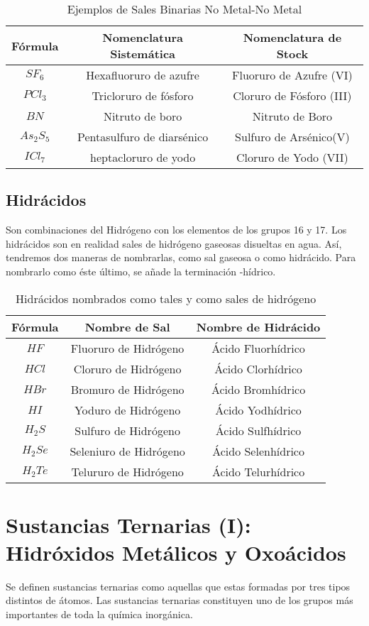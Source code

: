 \begin{table}[h!]
	\centering
	\begin{tabular}{c|cc}
		Fórmula&Nomenclatura Sistemática&Nomenclatura de Stock\\ \hline
		$SF_6$&Hexafluoruro de azufre&Fluoruro de Azufre (VI)\\ 
		$PCl_{3}$&Tricloruro de fósforo&Cloruro de Fósforo (III)\\
		$BN$&Nitruto de boro&Nitruto de Boro\\
		$As_{2}S_{5}$&Pentasulfuro de diarsénico&Sulfuro de Arsénico(V)\\
		$ICl_{7}$&heptacloruro de yodo&Cloruro de Yodo (VII)\\ \hline
	\end{tabular}
	\caption{Ejemplos de Sales Binarias No Metal-No Metal}
\end{table}

\subsection{Hidrácidos}
Son combinaciones del Hidrógeno con los elementos de los grupos 16 y 17. Los hidrácidos son en realidad sales de hidrógeno gaseosas disueltas en agua. Así, tendremos dos maneras de nombrarlas, como sal gaseosa o como hidrácido. Para nombrarlo como éste último, se añade la terminación -hídrico.

\begin{table}[h!]
	\centering
	\begin{tabular}{c|cc}
		Fórmula&Nombre de Sal&Nombre de Hidrácido\\ \hline
		$HF$&Fluoruro de Hidrógeno&Ácido Fluorhídrico\\ 
		$HCl$&Cloruro de Hidrógeno&Ácido Clorhídrico\\ 
		$HBr$&Bromuro de Hidrógeno&Ácido Bromhídrico\\ 
		$HI$&Yoduro de Hidrógeno&Ácido Yodhídrico\\ 
		$H_{2}S$&Sulfuro de Hidrógeno&Ácido Sulfhídrico\\
		$H_{2}Se$&Seleniuro de Hidrógeno&Ácido Selenhídrico\\
		$H_{2}Te$&Telururo de Hidrógeno&Ácido Telurhídrico\\ \hline
	\end{tabular}
	\caption{Hidrácidos nombrados como tales y como sales de hidrógeno}
\end{table}

\section{Sustancias Ternarias (I): Hidróxidos Metálicos y Oxoácidos}
Se definen sustancias ternarias como aquellas que estas formadas por tres tipos distintos de átomos. Las sustancias ternarias constituyen uno de los grupos más importantes de toda la química inorgánica.

